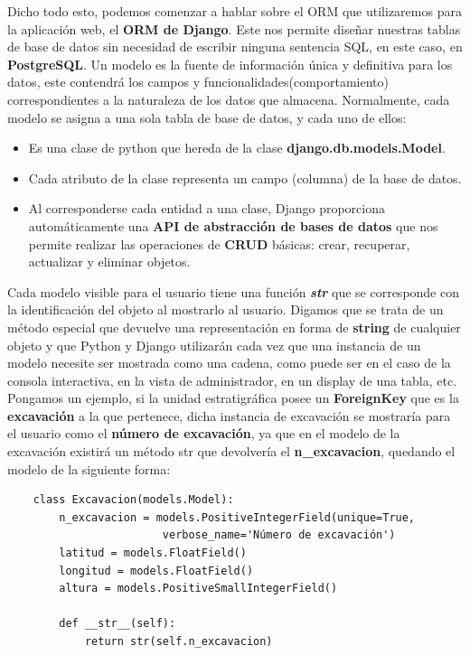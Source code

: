     Dicho todo esto, podemos comenzar a hablar sobre el ORM que utilizaremos para la
    aplicación web, el \textbf{ORM de Django}. Este nos permite diseñar nuestras tablas de 
    base de datos sin necesidad de escribir ninguna sentencia SQL, en este caso, en
    \textbf{PostgreSQL}. Un modelo es la fuente de información única y definitiva para los
    datos, este contendrá los campos y funcionalidades(comportamiento) correspondientes a
    la naturaleza de los datos que almacena. Normalmente, cada modelo se asigna a una sola
    tabla de base de datos, y cada uno de ellos:

        \begin{itemize}
            \item Es una clase de python que hereda de la clase \textbf{django.db.models.Model}.
            \item Cada atributo de la clase representa un campo (columna) de la base de datos.
            \item Al corresponderse cada entidad a una clase, Django proporciona automáticamente
            una \textbf{API de abstracción de bases de datos} que nos permite realizar las
            operaciones de \textbf{CRUD} básicas: crear, recuperar, actualizar y eliminar
            objetos.
        \end{itemize}

    Cada modelo visible para el usuario tiene una función \textbf{\textit{str}} que se
    corresponde con la identificación del objeto al mostrarlo al usuario. Digamos que se
    trata de un método especial que devuelve una representación en forma de \textbf{string} de
    cualquier objeto y que Python y Django utilizarán cada vez que una instancia de un 
    modelo necesite ser mostrada como una cadena, como puede ser en el caso de la consola
    interactiva, en la vista de administrador, en un display de una tabla, etc.\\

    Pongamos un ejemplo, si la unidad estratigráfica posee un \textbf{ForeignKey} que es
    la \textbf{excavación} a la que pertenece, dicha instancia de excavación se mostraría
    para el usuario como el \textbf{número de excavación}, ya que en el modelo de la
    excavación existirá un método str que devolvería el \textbf{n\_excavacion},
    quedando el modelo de la siguiente forma:

    
    \begin{verbatim}
    class Excavacion(models.Model):
        n_excavacion = models.PositiveIntegerField(unique=True, 
                        verbose_name='Número de excavación')
        latitud = models.FloatField()
        longitud = models.FloatField()
        altura = models.PositiveSmallIntegerField()

        def __str__(self):
            return str(self.n_excavacion)
    \end{verbatim}

